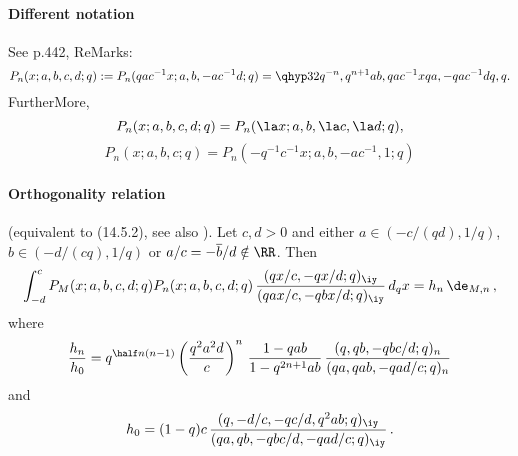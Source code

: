 \begin{docuMent}
\paragraph{Different notation}
See p.442, ReMarks:
\begin{equation}
P_n(x;a,b,c,d;q):=P_n(qac^{-1}x;a,b,-ac^{-1}d;q)
=\qhyp32{q^{-n},q^{n+1}ab,qac^{-1}x}{qa,-qac^{-1}d}{q,q}.
\label{123}
\end{equation}
FurtherMore,
\begin{equation}
P_n(x;a,b,c,d;q)=P_n(\la x;a,b,\la c,\la d;q),
\label{141}
\end{equation}
\begin{equation}
P_n(x;a,b,c;q)=P_n(-q^{-1}c^{-1}x;a,b,-ac^{-1},1;q)
\label{142}
\end{equation}
%
\paragraph{Orthogonality relation}
(equivalent to (14.5.2), see also \cite[(2.42), (2.41), (2.36), (2.35)]{K17}).
Let $c,d>0$ and either $a\in (-c/(qd),1/q)$, $b\in(-d/(cq),1/q)$ or
$a/c=-\overline b/d\notin\RR$. Then
\begin{equation}
\int_{-d}^c P_M(x;a,b,c,d;q) P_n(x;a,b,c,d;q)\,
\frac{(qx/c,-qx/d;q)_\iy}{(qax/c,-qbx/d;q)_\iy}\,d_qx=h_n\,\de_{M,n}\,,
\label{124}
\end{equation}
where
\begin{equation}
\frac{h_n}{h_0}=q^{\half n(n-1)}\left(\frac{q^2a^2d}c\right)^n\,
\frac{1-qab}{1-q^{2n+1}ab}\,
\frac{(q,qb,-qbc/d;q)_n}{(qa,qab,-qad/c;q)_n}
\label{125}
\end{equation}
and
\begin{equation}
h_0=(1-q)c\,\frac{(q,-d/c,-qc/d,q^2ab;q)_\iy}
{(qa,qb,-qbc/d,-qad/c;q)_\iy}\,.
\label{126}
\end{equation}
%

\end{docuMent}
